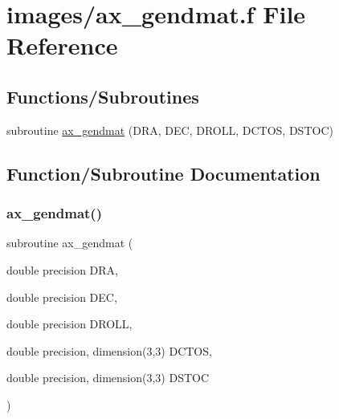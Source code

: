 \hypertarget{ax__gendmat_8f}{}\section{images/ax\+\_\+gendmat.f File Reference}
\label{ax__gendmat_8f}
\subsection*{Functions/\+Subroutines}
\begin{DoxyCompactItemize}
\item 
subroutine \hyperlink{ax__gendmat_8f_aeac83c922c5195ef52a7923ee917a7c2}{ax\+\_\+gendmat} (D\+RA, D\+EC, D\+R\+O\+LL, D\+C\+T\+OS, D\+S\+T\+OC)
\end{DoxyCompactItemize}


\subsection{Function/\+Subroutine Documentation}
\mbox{\label{ax__gendmat_8f_aeac83c922c5195ef52a7923ee917a7c2}} 
\subsubsection{\texorpdfstring{ax\+\_\+gendmat()}{ax\_gendmat()}}
{\footnotesize\ttfamily subroutine ax\+\_\+gendmat (\begin{DoxyParamCaption}\item[{double precision}]{D\+RA,  }\item[{double precision}]{D\+EC,  }\item[{double precision}]{D\+R\+O\+LL,  }\item[{double precision, dimension(3,3)}]{D\+C\+T\+OS,  }\item[{double precision, dimension(3,3)}]{D\+S\+T\+OC }\end{DoxyParamCaption})}

